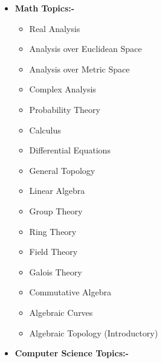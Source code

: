 \documentclass[10pt,a4paper,sans,colorlinks]{moderncv}        %
\begin{document}
\begin{itemize}
	\item 	\textbf{Math Topics:-}
 \begin{multicols}{2}
			      	\begin{itemize}
			      		\item Real Analysis
			      		\item Analysis over Euclidean Space
			      		\item Analysis over Metric Space
			      		 \item {Complex Analysis}
			      		  \item {Probability Theory}
			      		 
			      		 
			      		 \item {Calculus}
			      		 \item {Differential Equations}
			      \item {General Topology}
			     
			     
			     \item Linear Algebra
			     \item Group Theory
			     \item Ring Theory
			     \item Field Theory 
			     \item Galois Theory
			     \item {Commutative Algebra}
			     \item {Algebraic Curves}
			     \item {Algebraic Topology (Introductory)}
			      
	      \end{itemize}
			      \end{multicols}
	\item \textbf{Computer Science Topics:-}
	      \begin{itemize}



\end{itemize}
\end{itemize}
\end{document}
